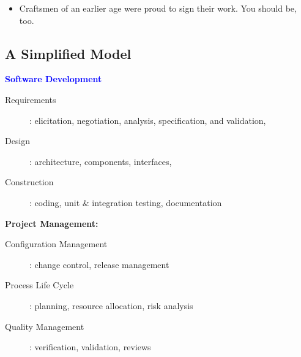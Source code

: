 \begin{itemize}




  \item {}
    Craftsmen of an earlier age were proud to sign their work. You should be, too.
\end{itemize}
%
\subsection{A Simplified Model}
\begin{minipage}[t]{0.45\linewidth}
\textcolor{blue}{\large\bfseries Software Development}
\begin{description}
  \item[Requirements]: elicitation, negotiation, analysis, specification, and validation,
  \item[Design]: architecture, components, interfaces,
  \item[Construction]: coding, unit \& integration testing, documentation %
\end{description}
\end{minipage}
\hfill
\begin{minipage}[t]{0.45\linewidth}
\textcolor{OliveGreen}{\large\bfseries Project Management:}
\begin{description}
\item[Configuration Management]: change control, release management
\item[Process Life Cycle]: planning, resource allocation, risk analysis
\item[Quality Management]: verification, validation, reviews
\end{description}
\end{minipage}

